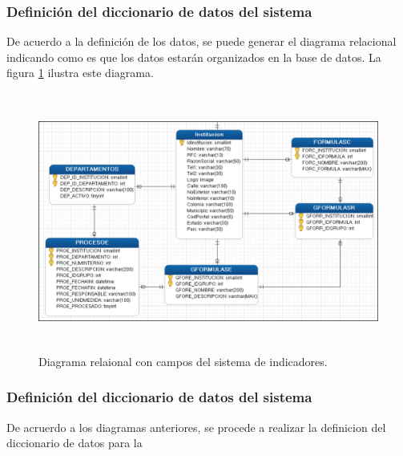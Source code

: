 		    \subsubsection{Definici\'on del diccionario de datos del sistema}

		    	De acuerdo a la definici\'on de los datos, se puede generar el diagrama relacional indicando como es que los datos estarán organizados en la base de datos. La figura \ref{fig_DEntidadRelComp} ilustra este diagrama.

		    	\begin{figure}[H]
			        \centering
			        \includegraphics[width=16cm, height=8.5cm]{figuras/Relacional}
			        \caption{Diagrama relaional con campos del sistema de indicadores.}
			        \label{fig_DEntidadRelComp}
			    \end{figure}

		    \subsubsection{Definici\'on del diccionario de datos del sistema}

		    	De acruerdo a los diagramas anteriores, se procede a realizar la definicion del diccionario de datos para la

